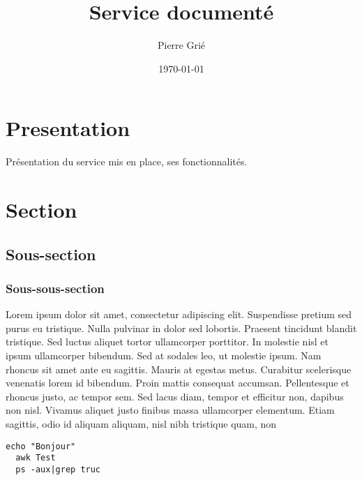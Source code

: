 \documentclass[10pt]{article}
\title{Service document\'e}
\author{Pierre Gri\'e}
\date{\today}
\begin{document}
\begin{titlepage}
\maketitle
\end{titlepage}

\restoregeometry

\linespread{1.15} %

\section{Presentation}

Pr\'esentation du service mis en place, ses fonctionnalit\'es.


\section{Section}

\subsection{Sous-section}

\subsubsection{Sous-sous-section}

Lorem ipsum dolor sit amet, consectetur adipiscing elit. Suspendisse pretium sed purus eu tristique. Nulla pulvinar in dolor sed lobortis. Praesent tincidunt blandit tristique. Sed luctus aliquet tortor ullamcorper porttitor. In molestie nisl et ipsum ullamcorper bibendum. Sed at sodales leo, ut molestie ipsum. Nam rhoncus sit amet ante eu sagittis. Mauris at egestas metus. Curabitur scelerisque venenatis lorem id bibendum. Proin mattis consequat accumsan. Pellentesque et rhoncus justo, ac tempor sem. Sed lacus diam, tempor et efficitur non, dapibus non nisl. Vivamus aliquet justo finibus massa ullamcorper elementum. Etiam sagittis, odio id aliquam aliquam, nisl nibh tristique quam, non\\

\begin{lstlisting}[title=Test]
  echo "Bonjour"
  awk Test
  ps -aux|grep truc
\end{lstlisting}
\end{document}
